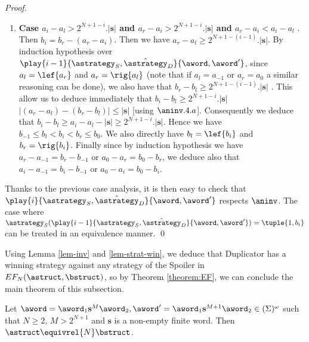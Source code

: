 \begin{proof}
\begin{enumerate}
\item \textbf{Case $a_i-a_l > 2^{N+1-i}.|\mathbf{s}|$ and $a_r-a_i > 2^{N+1-i}.|\mathbf{s}|$ and $a_r-a_i <a_i-a_l$ }. Then $b_i=b_r-(a_r-a_i)$. Then we have $a_r-a_l \geq 2^{N+1-(i-1)}.|\mathbf{s}|$. By induction hypothesis over $\play{i-1}{\astrategy_S,\hat\astrategy_D}{\aword,\aword'}$, since $a_l=\lef{a_r}$ and $a_r=\rig{a_l}$ (note that if $a_l=a_{-1}$ or $a_r=a_0$ a similar reasoning can be done),  we also have that  $b_r-b_l \geq  2^{N+1-(i-1)}.|\mathbf{s}|$ . This allow us to deduce immediately that  $b_i-b_l \geq 2^{N+1-i}.|\mathbf{s}|$ $|(a_r-a_l)-(b_r-b_l)| \leq |\mathbf{s}|$ [using $\aninv.4.a$]. Consequently we deduce that $b_i-b_l \geq a_i-a_l-|\mathbf{s}| \geq 2^{N+1-i}.|\mathbf{s}|$. Hence we have  $b_{-1} \leq b_l < b_i < b_r \leq b_0$. We also directly have $b_l=\lef{b_i}$ and $b_r=\rig{b_i}$. Finally since by induction hypothesis we have $a_{r}-a_{-1}=b_{r}-b_{-1}$ or $a_{0}-a_{r}=b_{0}-b_{r}$, we deduce also that $a_{i}-a_{-1}=b_{i}-b_{-1}$ or $a_{0}-a_{i}=b_{0}-b_{i}$.
 \end{enumerate}
 Thanks to the previous case analysis, it is then easy to check that $\play{i}{\astrategy_S,\hat\astrategy_D}{\aword,\aword'}$ respects $\aninv$. The case where $\astrategy_S(\play{i-1}{\astrategy_S,\hat\astrategy_D}{\aword,\aword'})=\tuple{1,b_i}$ can be treated in an equivalence manner. \qed



\end{proof}
Using Lemma \ref{lem-inv} and \ref{lem-strat-win}, we deduce that Duplicator has a winning strategy against any strategy of the Spoiler in $EF_N(\astruct,\bstruct)$, so by Theorem \ref{theorem:EF}, we can conclude the main theorem of this subsection.
\begin{theorem}
\label{theorem:stuttering}
Let $\aword = \aword_1 \mathbf{s}^M \aword_2, \aword'= \aword_1 \mathbf{s}^{M+1} \aword_2 \in (\Sigma)^{\omega}$  such that $N \geq 2$, $M> 2^{N+1}$ and $\mathbf{s}$ is a non-empty finite word. Then $\astruct\equivrel{N}\bstruct$.
\end{theorem}

